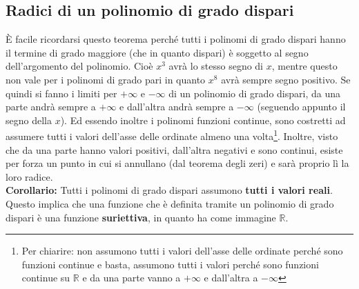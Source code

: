 \subsection{Radici di un polinomio di grado dispari}

È facile ricordarsi questo teorema perché tutti i polinomi di grado dispari hanno il termine di grado maggiore (che in quanto dispari) è soggetto al segno dell'argomento del polinomio. Cioè $x^3$ avrà lo stesso segno di $x$, mentre questo non vale per i polinomi di grado pari in quanto $x^8$ avrà sempre segno positivo. Se quindi si fanno i limiti per $+\infty$ e $-\infty$ di un polinomio di grado dispari, da una parte andrà sempre a $+\infty$ e dall'altra andrà sempre a $-\infty$ (seguendo appunto il segno della $x$). Ed essendo inoltre i polinomi funzioni continue, sono costretti ad assumere tutti i valori dell'asse delle ordinate almeno una volta\footnote{Per chiarire: non assumono tutti i valori dell'asse delle ordinate perché sono funzioni continue e basta, assumono tutti i valori perché sono funzioni continue su $\mathbb{R}$ e da una parte vanno a $+\infty$ e dall'altra a $-\infty$}. Inoltre, visto che da una parte hanno valori positivi, dall'altra negativi e sono continui, esiste per forza un punto in cui si annullano (dal teorema degli zeri) e sarà proprio lì la loro radice.\\

\textbf{Corollario:}
Tutti i polinomi di grado dispari assumono \textbf{tutti i valori reali}. Questo implica che una funzione che è definita tramite un polinomio di grado dispari è una funzione \textbf{suriettiva}, in quanto ha come immagine $\mathbb{R}$.

